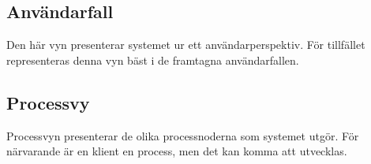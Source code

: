 \subsection{Användarfall}
Den här vyn presenterar systemet ur ett användarperspektiv. För tillfället representeras denna vyn bäst i de framtagna användarfallen. 
\subsection{Processvy}
Processvyn presenterar de olika processnoderna som systemet utgör. För närvarande är en klient en process, men det kan komma att utvecklas.

